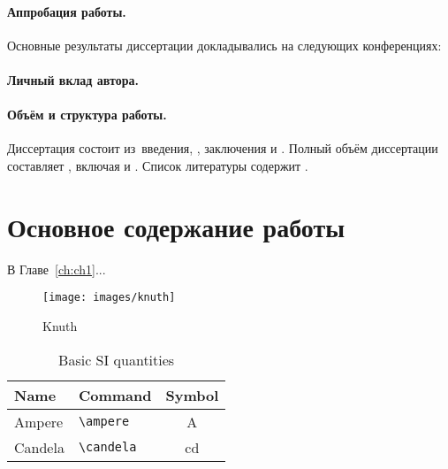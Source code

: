 \paragraph*{Аппробация работы.}
Основные результаты диссертации докладывались на следующих конференциях:
\printConferenceRU

\paragraph*{Личный вклад автора.}


\paragraph*{Объём и структура работы.}
Диссертация состоит из~введения,
,
заключения и
.
%
Полный объём диссертации составляет
, включая
 и
.
Список литературы содержит
.




\newpage
\section*{Основное содержание работы}

В Главе~\ref{ch:ch1}...

\begin{figure}
    \centering
    \texttt{[image: images/knuth]}
    \caption{Knuth}
\end{figure}
\begin{table}
	\centering
	\caption{Basic SI quantities}%
	\begin{tabular}{llc}
		\toprule
		Name 	& 	Command 	& 	Symbol         \\
		\midrule
		Ampere     & \verb|\ampere| & \si{\ampere}   \\
		Candela   & \verb|\candela| & \si{\candela}  \\
		\bottomrule
	\end{tabular}
\end{table}

